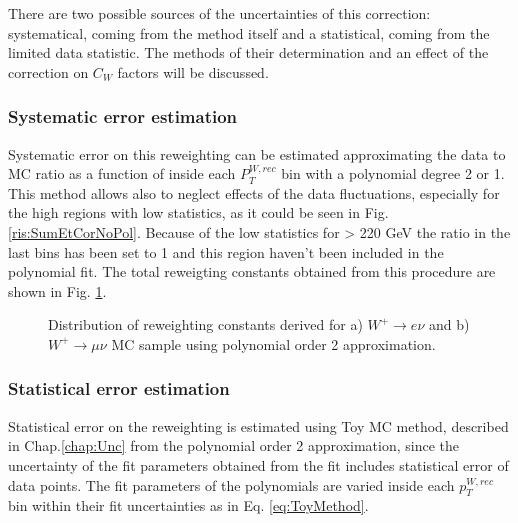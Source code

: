 There are two possible sources of the uncertainties of this correction: systematical, coming from the method itself and a statistical, coming from the limited data statistic. The methods of their determination and an effect of the correction on $C_{W}$ factors will be discussed.

\subsubsection{Systematic error estimation}

Systematic error on this reweighting can be estimated approximating the data to MC ratio as a function of \sumet inside each $P_T^{W, rec}$ bin with a polynomial degree 2 or 1. This method allows also to neglect effects of the data fluctuations, especially for the high \sumet regions with low statistics, as it could be seen in Fig. \ref{ris:SumEtCorNoPol}. Because of the low statistics for \sumet > 220 GeV the ratio in the last bins has been set to 1 and this region haven't been included in the polynomial fit. The total reweigting constants obtained from this procedure are shown in Fig. \ref{ris:SumEtCorPol}. 

\begin{figure}[!tbp]
\begin{minipage}[h]{0.49\linewidth}
\end{minipage}
\hfill
\begin{minipage}[h]{0.49\linewidth}
\end{minipage}
\caption{Distribution of \sumet reweighting constants derived for a) $W^{+} \to e \nu$ and b) $W^{+} \to \mu \nu$ MC sample using polynomial order 2 approximation.}
\label{ris:SumEtCorPol}
\end{figure}

\subsubsection{Statistical error estimation}

Statistical error on the \sumet reweighting is estimated using Toy MC method, described in Chap.\ref{chap:Unc} from the polynomial order 2 approximation, since the uncertainty of the fit parameters obtained from the fit includes statistical error of data points. The fit parameters of the polynomials are varied inside each $p_T^{W, rec}$ bin within their fit uncertainties as in Eq. \ref{eq:ToyMethod}. 

